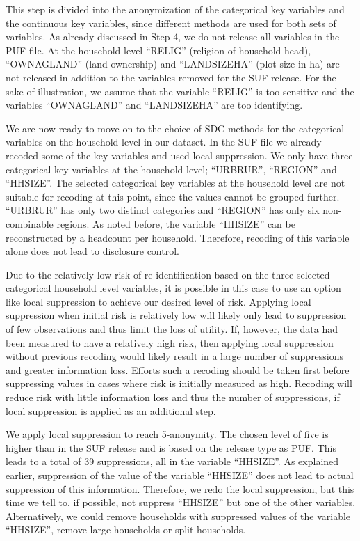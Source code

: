 \documentclass[letterpaper,10pt,english]{sphinxmanual}
\begin{document}

This step is divided into the anonymization of the categorical key
variables and the continuous key variables, since different methods are
used for both sets of variables. As already discussed in Step 4, we do
not release all variables in the PUF file. At the household level
“RELIG” (religion of household head), “OWNAGLAND” (land ownership) and
“LANDSIZEHA” (plot size in ha) are not released in addition to the
variables removed for the SUF release. For the sake of illustration, we
assume that the variable “RELIG” is too sensitive and the variables
“OWNAGLAND” and “LANDSIZEHA” are too identifying.


We are now ready to move on to the choice of SDC methods for the
categorical variables on the household level in our dataset. In the SUF
file we already recoded some of the key variables and used local
suppression. We only have three categorical key variables at the
household level; “URBRUR”, “REGION” and “HHSIZE”. The selected
categorical key variables at the household level are not suitable for
recoding at this point, since the values cannot be grouped further.
“URBRUR” has only two distinct categories and “REGION” has only six
non-combinable regions. As noted before, the variable “HHSIZE” can be
reconstructed by a headcount per household. Therefore, recoding of this
variable alone does not lead to disclosure control.

Due to the relatively low risk of re-identification based on the three
selected categorical household level variables, it is possible in this
case to use an option like local suppression to achieve our desired
level of risk. Applying local suppression when initial risk is
relatively low will likely only lead to suppression of few observations
and thus limit the loss of utility. If, however, the data had been
measured to have a relatively high risk, then applying local suppression
without previous recoding would likely result in a large number of
suppressions and greater information loss. Efforts such a recoding
should be taken first before suppressing values in cases where risk is
initially measured as high. Recoding will reduce risk with little
information loss and thus the number of suppressions, if local
suppression is applied as an additional step.

We apply local suppression to reach 5-anonymity. The chosen level of
five is higher than in the SUF release and is based on the release type
as PUF. This leads to a total of 39 suppressions, all in the variable
“HHSIZE”. As explained earlier, suppression of the value of the variable
“HHSIZE” does not lead to actual suppression of this information.
Therefore, we redo the local suppression, but this time we tell
 to, if possible, not suppress “HHSIZE” but one of the other
variables. Alternatively, we could remove households with suppressed
values of the variable “HHSIZE”, remove large households or split
households.
\end{document}
